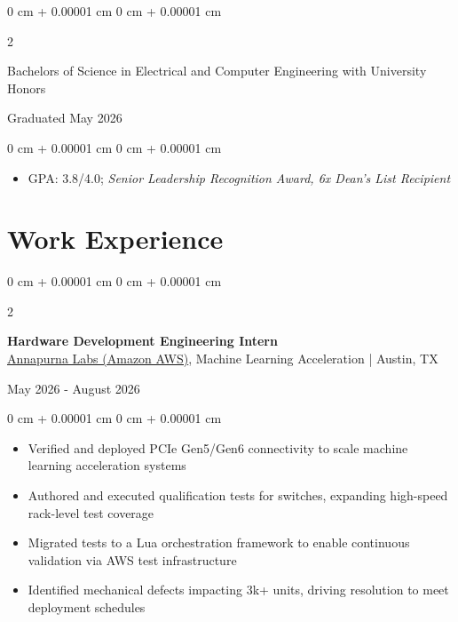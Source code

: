 \documentclass[10pt, letterpaper]{article}
\newlength{\betweenSubEntriesSpace}
\newlength{\entryToBulletsSpace}
\newlength{\bulletsTopSep}
\newlength{\bulletsParsep}
\newenvironment{highlights}{
    \begin{itemize}[
        label=-,
        topsep=\bulletsTopSep,
        parsep=\bulletsParsep,
        partopsep=0pt,
        itemsep=0pt,
        leftmargin=0 cm + 10pt
    ]
}{
    \end{itemize}
} %
\newenvironment{onecolentry}{
    \begin{adjustwidth}{
        0 cm + 0.00001 cm
    }{
        0 cm + 0.00001 cm
    }
}{
    \end{adjustwidth}
} %
\newenvironment{twocolentry}[2][]{
    \onecolentry
    \def\secondColumn{#2}
    \setcolumnwidth{\fill, 4.5 cm}
    \begin{paracol}{2}
}{
    \switchcolumn \raggedleft \secondColumn
    \end{paracol}
    \endonecolentry
} %
\begin{document}
        \vspace{\betweenSubEntriesSpace} %
    
        \begin{twocolentry}
            {Graduated May 2026}
            {Bachelors of Science in Electrical and Computer Engineering with University Honors}
        \end{twocolentry}
        \vspace{\entryToBulletsSpace}
        \begin{onecolentry}
            \begin{highlights}

                \item GPA: 3.8/4.0; \textit{Senior Leadership Recognition Award, 6x Dean's List Recipient}
            
            \end{highlights}
        \end{onecolentry}


    \section{Work Experience}


        \begin{twocolentry} 
            {May 2026 - August 2026}
            {\textbf{Hardware Development Engineering Intern} \\
            \href{https://aws.amazon.com}{\underline{Annapurna Labs (Amazon AWS)}}, Machine Learning Acceleration | Austin, TX}
        \end{twocolentry}
        \vspace{\entryToBulletsSpace}
        \begin{onecolentry}
            \begin{highlights}
        
                \item Verified and deployed PCIe Gen5/Gen6 connectivity to scale machine learning acceleration systems
                \item Authored and executed qualification tests for switches, expanding high-speed rack-level test coverage
                \item Migrated tests to a Lua orchestration framework to enable continuous validation via AWS test infrastructure
                \item Identified mechanical defects impacting 3k+ units, driving resolution to meet deployment schedules
        
            \end{highlights}
        \end{onecolentry}
\end{document}
